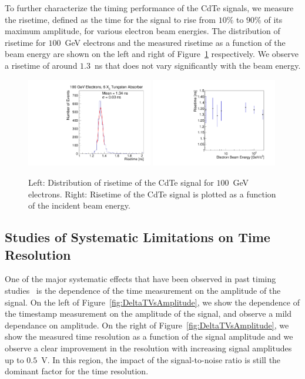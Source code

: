 To further characterize the timing performance of the CdTe signals, we measure the
risetime, defined as the time for the signal to rise from $10\%$ to $90\%$ of its maximum
amplitude, for various electron beam energies. The distribution of risetime for
$100$~GeV electrons and the measured risetime as a function of the beam energy
are shown on the left and right of Figure~\ref{fig:riseTime} respectively. 
We observe a risetime of around $1.3$~ns that does not vary significantly
with the beam energy.


\begin{figure}[htbp] 
\centering
\includegraphics[width=0.49\textwidth]{figures/100GeV_risetime.pdf} 
\includegraphics[width=0.49\textwidth]{figures/RisetimeVsEnergy.pdf} 
\caption{ Left: Distribution of risetime of the CdTe signal for $100$~GeV electrons. 
Right: Risetime of the CdTe signal is plotted as a function of the incident beam energy. } 
\label{fig:riseTime} 
\end{figure} 



\subsection{Studies of Systematic Limitations on Time Resolution}
\label{sec:systematicLimitations}

One of the major systematic effects that have been observed in past
timing studies~\cite{Anderson:2015gha,Ronzhin201552,MCPShowerMaxPaper} is the dependence 
of the time measurement on the amplitude of the signal. On the left of 
Figure~\ref{fig:DeltaTVsAmplitude}, we show the dependence of the timestamp measurement 
on the amplitude of the signal, and observe a mild dependance on amplitude.
On the right of Figure~\ref{fig:DeltaTVsAmplitude}, we show the measured time resolution
as a function of the signal amplitude and we observe a clear improvement
in the resolution with increasing signal amplitudes up to $0.5$~V.
In this region, the impact of the signal-to-noise ratio is still 
the dominant factor for the time resolution.

